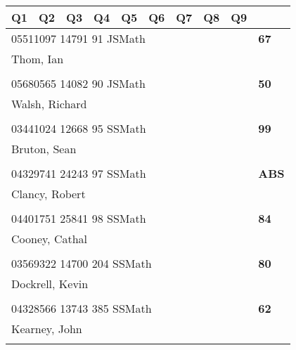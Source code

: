 \documentclass[a4paper,12pt]{article}
\begin{document}
\begin{tabular}{
   |p{9mm}|
    p{9mm}|
    p{9mm}|
    p{9mm}|
    p{9mm}|
    p{9mm}|
    p{9mm}|
    p{9mm}|
    p{9mm}|
    p{9mm}|}
\hline\hline
Q1 & Q2 & Q3 & Q4 & Q5 & Q6 & Q7 & Q8 & Q9 &     \\
\hline\hline
\multicolumn{9}{|l|}{05511097 14791 91 JSMath} & \textbf{67} \\
\hline
\multicolumn{10}{|l|}{Thom, Ian} \\
\hline
   \vrule height8mm width0pt depth2mm 
      &    &    &    &    &    &    &    &    &     \\
\hline\hline
\multicolumn{9}{|l|}{05680565 14082 90 JSMath} & \textbf{50} \\
\hline
\multicolumn{10}{|l|}{Walsh, Richard} \\
\hline
   \vrule height8mm width0pt depth2mm 
      &    &    &    &    &    &    &    &    &     \\
\hline\hline
\multicolumn{9}{|l|}{03441024 12668 95 SSMath} & \textbf{99} \\
\hline
\multicolumn{10}{|l|}{Bruton, Sean} \\
\hline
   \vrule height8mm width0pt depth2mm 
      &    &    &    &    &    &    &    &    &     \\
\hline\hline
\multicolumn{9}{|l|}{04329741 24243 97 SSMath} & \textbf{ABS} \\
\hline
\multicolumn{10}{|l|}{Clancy, Robert} \\
\hline
   \vrule height8mm width0pt depth2mm 
      &    &    &    &    &    &    &    &    &     \\
\hline\hline
\multicolumn{9}{|l|}{04401751 25841 98 SSMath} & \textbf{84} \\
\hline
\multicolumn{10}{|l|}{Cooney, Cathal} \\
\hline
   \vrule height8mm width0pt depth2mm 
      &    &    &    &    &    &    &    &    &     \\
\hline\hline
\multicolumn{9}{|l|}{03569322 14700 204 SSMath} & \textbf{80} \\
\hline
\multicolumn{10}{|l|}{Dockrell, Kevin} \\
\hline
   \vrule height8mm width0pt depth2mm 
      &    &    &    &    &    &    &    &    &     \\
\hline\hline
\multicolumn{9}{|l|}{04328566 13743 385 SSMath} & \textbf{62} \\
\hline
\multicolumn{10}{|l|}{Kearney, John} \\
\hline
   \vrule height8mm width0pt depth2mm 

\end{tabular}
\end{document}
